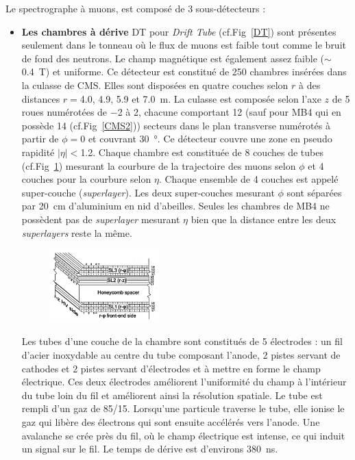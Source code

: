 Le spectrographe à muons, est composé de \num{3} sous-détecteurs :
\begin{itemize}[label=$\bullet$]
	\item \textbf{Les chambres à dérive} DT pour \textit{Drift Tube} (cf.Fig~\ref{DT}) sont présentes seulement dans le tonneau où le flux de muons est faible tout comme le bruit de fond des neutrons. Le champ magnétique est également assez faible ($\sim$\SI{0.4}{\tesla}) et uniforme. Ce détecteur est constitué de \num{250} chambres insérées dans la culasse de CMS. Elles sont disposées en quatre couches selon $r$ à des distances $r=$\num{4.0}, \num{4.9}, \num{5.9} et \SI{7.0}{\meter}. La culasse est composée selon l'axe $z$ de \num{5} roues numérotées de $-$\num{2} à \num{2}, chacune comportant \num{12} (sauf pour MB4 qui en possède \num{14} (cf.Fig~\ref{CMS2})) secteurs dans le plan transverse numérotés à partir de $\phi=$\num{0} et couvrant \SI{30}{\degree}. Ce détecteur couvre une zone en pseudo rapidité $|\eta|<$\num{1.2}. Chaque chambre est constituée de \num{8} couches de tubes (cf.Fig~\ref{DT1}) mesurant la courbure de la trajectoire des muons selon $\phi$ et \num{4} couches pour la courbure selon $\eta$. Chaque ensemble de \num{4} couches est appelé super-couche (\textit{superlayer}). Les deux super-couches mesurant $\phi$ sont séparées par \SI{20}{\centi\meter} d'aluminium en nid d'abeilles. Seules les chambres de MB4 ne possèdent pas de \textit{superlayer} mesurant $\eta$ bien que la distance entre les deux \textit{superlayers} reste la même.
	\begin{figure}[ht!]
		\centering
		\includegraphics[width=0.40\textwidth]{CMS/DTchamber.png}
		\label{DT1}
	\end{figure}

    Les tubes d'une couche de la chambre sont constitués de \num{5} électrodes : un fil d'acier inoxydable au centre du tube composant l'anode, \num{2} pistes servant de cathodes et \num{2} pistes servant d'électrodes et à mettre en forme le champ électrique. Ces deux électrodes améliorent l'uniformité du champ à l'intérieur du tube loin du fil et améliorent ainsi la résolution spatiale. Le tube est rempli d'un gaz de  \num{85}/\num{15}. Lorsqu'une particule traverse le tube, elle ionise le gaz qui libère des électrons qui sont ensuite accélérés vers l'anode. Une avalanche se crée près du fil, où le champ électrique est intense, ce qui induit un signal sur le fil. Le temps de dérive est d'environs \SI{380}{\nano\second}. 
    

\end{itemize}
